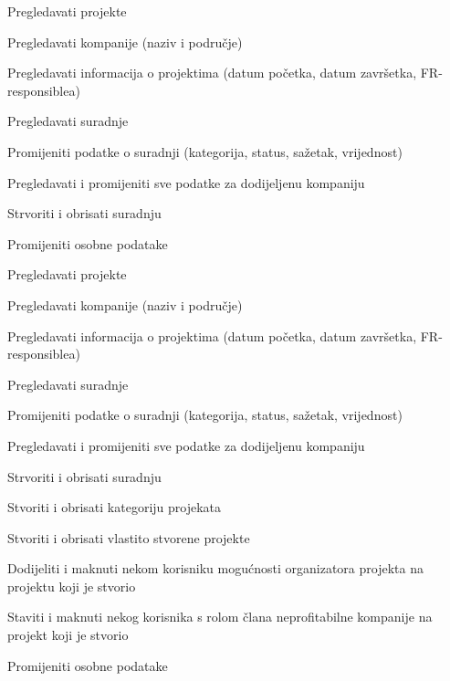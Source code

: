 \begin{packed_enum}
\begin{packed_enum}
				\end{packed_enum}

				\item  {} 

				\begin{packed_enum}

					\item Pregledavati projekte
					\item Pregledavati kompanije (naziv i područje)
					\item Pregledavati informacija o projektima (datum početka, datum završetka, FR-responsiblea)
					\item Pregledavati suradnje
					\item Promijeniti podatke o suradnji (kategorija, status, sažetak, vrijednost)
					\item Pregledavati i promijeniti sve podatke za dodijeljenu kompaniju
					\item Strvoriti i obrisati suradnju
					\item Promijeniti osobne podatake

				\end{packed_enum}

				\item  {} 

				\begin{packed_enum}

					\item Pregledavati projekte
					\item Pregledavati kompanije (naziv i područje)
					\item Pregledavati informacija o projektima (datum početka, datum završetka, FR-responsiblea)
					\item Pregledavati suradnje
					\item Promijeniti podatke o suradnji (kategorija, status, sažetak, vrijednost)
					\item Pregledavati i promijeniti sve podatke za dodijeljenu kompaniju
					\item Strvoriti i obrisati suradnju
					\item Stvoriti i obrisati kategoriju projekata
					\item Stvoriti i obrisati vlastito stvorene projekte
					\item Dodijeliti i maknuti nekom korisniku mogućnosti organizatora projekta na projektu koji je stvorio
					\item Staviti i maknuti nekog korisnika s rolom člana neprofitabilne kompanije na projekt koji je stvorio
					\item Promijeniti osobne podatake


\end{packed_enum}
\end{packed_enum}
